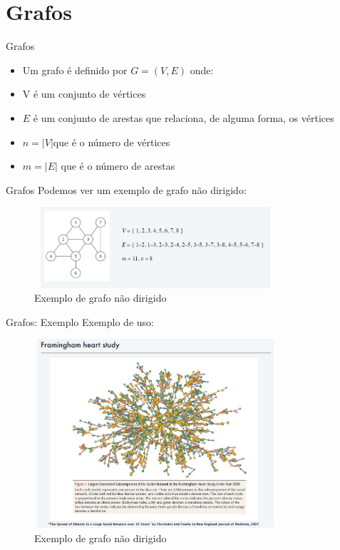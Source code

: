\section{Grafos}

\begin{frame}
	\begin{block}{Grafos}
		\begin{itemize}
			\item Um grafo é definido por $G = (V, E)$ onde: 
			\item V é um conjunto de vértices
			\item $E$ é um conjunto de arestas que relaciona, de alguma forma, os vértices
			\item $n = |V|$que é o número de vértices
			\item $m = |E|$ que é o número de arestas
		\end{itemize}
	\end{block}
\end{frame}

\begin{frame}
	\begin{block}{Grafos}
		Podemos ver um exemplo de grafo não dirigido:
		\begin{figure}[!htb]
			\centering	  				
			\includegraphics[height=3cm, width = 9cm]{./pic/grafoNaoDirigido.jpg}
			\caption{Exemplo de grafo não dirigido}
			\label{fig_pilha}
		\end{figure}
	\end{block}
\end{frame}

\begin{frame}
	\begin{block}{Grafos: Exemplo}
		Exemplo de uso:
		\begin{figure}[!htb]
			\centering	  				
			\includegraphics[height=7cm, width = 9cm]{./pic/exemploGrafo.jpg}
			\caption{Exemplo de grafo não dirigido}
			\label{fig_pilha}
		\end{figure}
	\end{block}
\end{frame}


